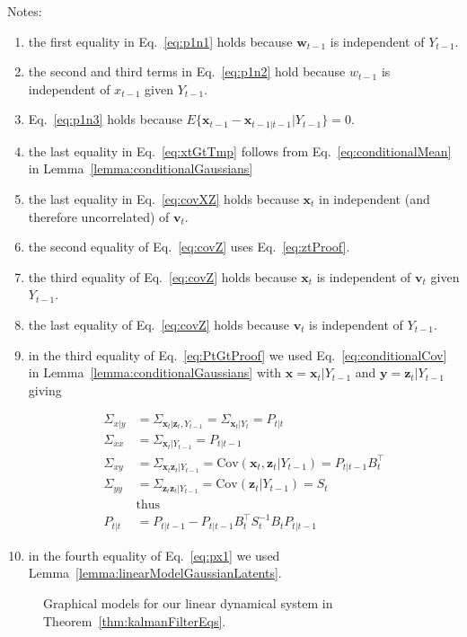 \documentclass[12pt]{article}
\begin{document}
Notes:
\begin{enumerate}
    \item the first equality in Eq.~\ref{eq:p1n1} holds because
        $\mathbf{w}_{t-1}$ is independent of $Y_{t-1}$.
    \item the second and third terms in Eq.~\ref{eq:p1n2} hold because
        $w_{t-1}$ is independent of $x_{t-1}$ given $Y_{t-1}$.
    \item Eq.~\ref{eq:p1n3} holds because
        $E\{\mathbf{x}_{t-1}-\mathbf{x}_{t-1|t-1}|Y_{t-1}\}=0$.
    \item the last equality in Eq.~\ref{eq:xtGtTmp} follows from Eq.~\ref{eq:conditionalMean} in
        Lemma~\ref{lemma:conditionalGaussians}
    \item the last equality in Eq.~\ref{eq:covXZ} holds because $\mathbf{x}_t$
        in independent (and therefore uncorrelated) of $\mathbf{v}_t$.
    \item the second equality of Eq.~\ref{eq:covZ} uses Eq.~\ref{eq:ztProof}.
    \item the third equality of Eq.~\ref{eq:covZ} holds because $\mathbf{x}_t$
        is independent of $\mathbf{v}_t$ given $Y_{t-1}$.
    \item the last equality of Eq.~\ref{eq:covZ} holds because $\mathbf{v}_t$
        is independent of $Y_{t-1}$.
	\item in the third equality of Eq.~\ref{eq:PtGtProof} we used Eq.~\ref{eq:conditionalCov} in Lemma~\ref{lemma:conditionalGaussians}
	with $\mathbf{x}=\mathbf{x}_t|Y_{t-1}$ and $\mathbf{y}=\mathbf{z}_t|Y_{t-1}$ giving

		\begin{align*}
			\Sigma_{x|y}&=\Sigma_{\mathbf{x}_t|\mathbf{z}_t,Y_{t-1}}=\Sigma_{\mathbf{x}_t|Y_t}=P_{t|t}\\
			\Sigma_{xx}&=\Sigma_{\mathbf{x}_t|Y_{t-1}}=P_{t|t-1}\\
			\Sigma_{xy}&=\Sigma_{\mathbf{x}_t\mathbf{z}_t|Y_{t-1}}=\text{Cov}(\mathbf{x}_t,\mathbf{z}_t|Y_{t-1})=P_{t|t-1}B_t^\intercal\\
			\Sigma_{yy}&=\Sigma_{\mathbf{z}_t\mathbf{z}_t|Y_{t-1}}=\text{Cov}(\mathbf{z}_t|Y_{t-1})=S_t\\
                        &\text{thus}\\
            P_{t|t}&=P_{t|t-1}-P_{t|t-1}B_t^\intercal S_t^{-1}B_tP_{t|t-1}
		\end{align*}
	\item in the fourth equality of Eq.~\ref{eq:px1} we used Lemma~\ref{lemma:linearModelGaussianLatents}.

\end{enumerate}

\begin{figure}
    \centering
    
    \caption{Graphical models for our linear dynamical system in
    Theorem~\ref{thm:kalmanFilterEqs}.}
    \label{fig:ldsModel}
\end{figure}





\end{document}
